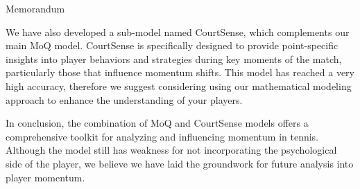 \documentclass[12pt]{article}  %
\begin{document}
\begin{letter}{Memorandum}
\begin{multicols}{2}
	
	
	We have also developed a sub-model named CourtSense, which complements our main MoQ model. CourtSense is specifically designed to provide point-specific insights into player behaviors and strategies during key moments of the match, particularly those that influence momentum shifts. This model has reached a very high accuracy, therefore we suggest considering using our mathematical modeling approach to enhance the understanding of your players.
	
	In conclusion, the combination of MoQ and CourtSense models offers a comprehensive toolkit for analyzing and influencing momentum in tennis. Although the model still has weakness for not incorporating the psychological side of the player, we believe we have laid the groundwork for future analysis into player momentum.
	
	\end{multicols}
	
\end{letter}




\setcounter{savedpage}{\value{page}}
 
\setcounter{page}{\value{savedpage}}
\end{document}
